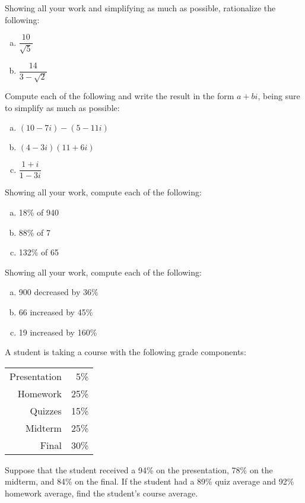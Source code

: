 \documentclass[12pt,letterpaper]{exam}
\begin{document}
\begin{questions}
\newpage
\question[10] Showing all your work and simplifying as much as possible, rationalize the following:
	\begin{enumerate}[(a)] \itemsep=0.3cm
	\item $\dfrac{10}{\sqrt{5}}$
	\item $\dfrac{14}{3 - \sqrt{2}}$
	\end{enumerate}



\newpage
\question[10] Compute each of the following and write the result in the form $a + bi$, being sure to simplify as much as possible:
	\begin{enumerate}[(a)]
	\item $(10 - 7i) - (5 - 11i)$
	\item $(4 - 3i)(11 + 6i)$
	\item $\dfrac{1 + i}{1 - 3i}$
	\end{enumerate}



\newpage
\question[10] Showing all your work, compute each of the following:
	\begin{enumerate}[(a)]
	\item 18\% of 940
	\item 88\% of 7
	\item 132\% of 65
	\end{enumerate}



\newpage
\question[10] Showing all your work, compute each of the following:
	\begin{enumerate}[(a)]
	\item 900 decreased by 36\%
	\item 66 increased by 45\%
	\item 19 increased by 160\%
	\end{enumerate}



\newpage
\question[10] A student is taking a course with the following grade components:
	\begin{table}[!ht]
	\centering
	\begin{tabular}{rr}
	Presentation & 5\% \\
	Homework & 25\% \\
	Quizzes & 15\% \\
	Midterm & 25\% \\
	Final & 30\% 
	\end{tabular}
	\end{table} \par
Suppose that the student received a 94\% on the presentation, 78\% on the midterm, and 84\% on the final. If the student had a 89\% quiz average and 92\% homework average, find the student's course average. 




\end{questions}
\end{document}

